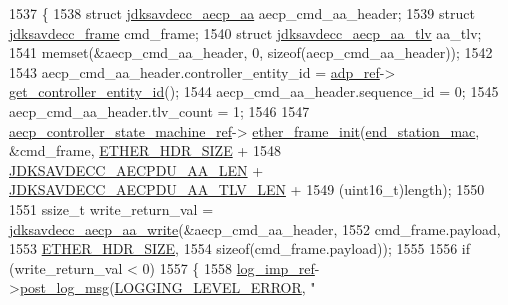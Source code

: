 \begin{DoxyCode}
1537 \{
1538     \textcolor{keyword}{struct }\hyperlink{structjdksavdecc__aecp__aa}{jdksavdecc\_aecp\_aa} aecp\_cmd\_aa\_header;
1539     \textcolor{keyword}{struct }\hyperlink{structjdksavdecc__frame}{jdksavdecc\_frame} cmd\_frame;
1540     \textcolor{keyword}{struct }\hyperlink{structjdksavdecc__aecp__aa__tlv}{jdksavdecc\_aecp\_aa\_tlv} aa\_tlv;
1541     memset(&aecp\_cmd\_aa\_header, 0, \textcolor{keyword}{sizeof}(aecp\_cmd\_aa\_header));
1542 
1543     aecp\_cmd\_aa\_header.controller\_entity\_id = \hyperlink{classavdecc__lib_1_1end__station__imp_a0b7b5ce956637a18c695ba20f2d4908c}{adp\_ref}->
      \hyperlink{classavdecc__lib_1_1adp_a0c0959a46658c0a22e9530334b2912da}{get\_controller\_entity\_id}();
1544     aecp\_cmd\_aa\_header.sequence\_id = 0;
1545     aecp\_cmd\_aa\_header.tlv\_count = 1;
1546 
1547     \hyperlink{namespaceavdecc__lib_a0b1b5aea3c0490f77cbfd9178af5be22}{aecp\_controller\_state\_machine\_ref}->
      \hyperlink{classavdecc__lib_1_1aecp__controller__state__machine_a86ff947c5e6b799cfb877d3767bfa1f9}{ether\_frame\_init}(\hyperlink{classavdecc__lib_1_1end__station__imp_a0e9fa7b31d903107ff9e7aac9dac172d}{end\_station\_mac}, &cmd\_frame, 
      \hyperlink{namespaceavdecc__lib_a6c827b1a0d973e18119c5e3da518e65ca9512ad9b34302ba7048d88197e0a2dc0}{ETHER\_HDR\_SIZE} +
1548                                                                                          
      \hyperlink{group___a_e_c_p___a_a__offsets_ga624792b524d0f0f8ef18c2f4895003aa}{JDKSAVDECC\_AECPDU\_AA\_LEN} + \hyperlink{group___a_e_c_p___a_a__tlv_ga8c9adb511e50d7ed81e30527a0f86d5b}{JDKSAVDECC\_AECPDU\_AA\_TLV\_LEN}
       +
1549                                                                                          (uint16\_t)length);
1550 
1551     ssize\_t write\_return\_val = \hyperlink{group___a_e_c_p___a_a_ga63d1243cc1c62ab7cc8c4944a1fd2c37}{jdksavdecc\_aecp\_aa\_write}(&aecp\_cmd\_aa\_header,
1552                                                         cmd\_frame.payload,
1553                                                         \hyperlink{namespaceavdecc__lib_a6c827b1a0d973e18119c5e3da518e65ca9512ad9b34302ba7048d88197e0a2dc0}{ETHER\_HDR\_SIZE},
1554                                                         \textcolor{keyword}{sizeof}(cmd\_frame.payload));
1555 
1556     \textcolor{keywordflow}{if} (write\_return\_val < 0)
1557     \{
1558         \hyperlink{namespaceavdecc__lib_acbe3e2a96ae6524943ca532c87a28529}{log\_imp\_ref}->\hyperlink{classavdecc__lib_1_1log_a68139a6297697e4ccebf36ccfd02e44a}{post\_log\_msg}(\hyperlink{namespaceavdecc__lib_a501055c431e6872ef46f252ad13f85cdaf2c4481208273451a6f5c7bb9770ec8a}{LOGGING\_LEVEL\_ERROR}, \textcolor{stringliteral}{"
}
\end{DoxyCode}
